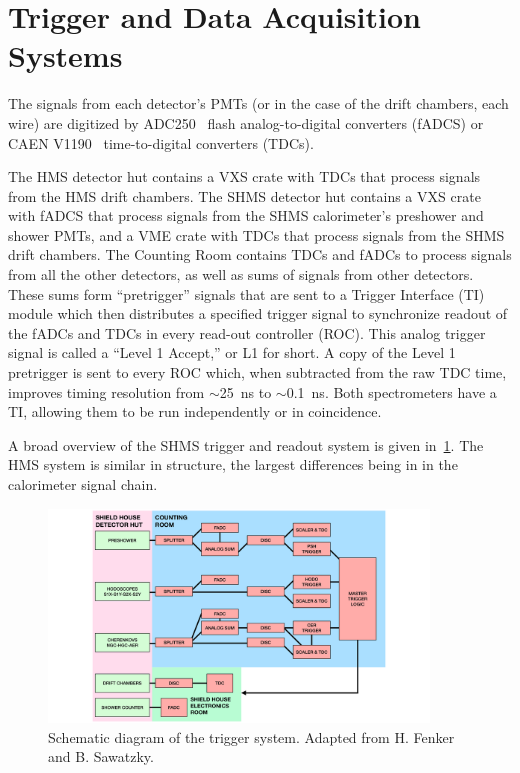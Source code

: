 \section{Trigger and Data Acquisition Systems}
\label{sec:daq}

The signals from each detector's PMTs (or in the case of the drift chambers,
each wire) are digitized by ADC250~\cite{fADC_manual} flash analog-to-digital
converters (fADCS) or CAEN V1190~\cite{CAEN_1190_manual} time-to-digital
converters (TDCs).

The HMS detector hut contains a VXS crate with TDCs that process signals from
the HMS drift chambers.
The SHMS detector hut contains a VXS crate with fADCS that process signals from
the SHMS calorimeter's preshower and shower PMTs, and a VME crate with TDCs
that process signals from the SHMS drift chambers.
The Counting Room contains TDCs and fADCs to process signals from all the other
detectors, as well as sums of signals from other detectors.
These sums form ``pretrigger'' signals that are sent to a Trigger Interface
(TI) module which then distributes a specified trigger signal to synchronize
readout of the fADCs and TDCs in every read-out controller (ROC).
This analog trigger signal is called a ``Level 1 Accept,'' or L1 for short.
A copy of the Level 1 pretrigger is sent to every ROC which, when subtracted
from the raw TDC time, improves timing resolution from $\sim$\SI{25}{ns} to
$\sim$\SI{0.1}{ns}.
Both spectrometers have a TI, allowing them to be run independently or in
coincidence.


A broad overview of the SHMS trigger and readout system is given
in~\ref{fig:trigger_block_diagram}.
The HMS system is similar in structure, the largest differences being in in the
calorimeter signal chain.

\begin{figure}[!h]
    \centering
    \includegraphics[width=0.9\textwidth]{chap3/trigger_block_diagram.pdf}
    \caption{Schematic diagram of the trigger system.
             Adapted from H. Fenker and B. Sawatzky.
             }
    \label{fig:trigger_block_diagram}
\end{figure}

